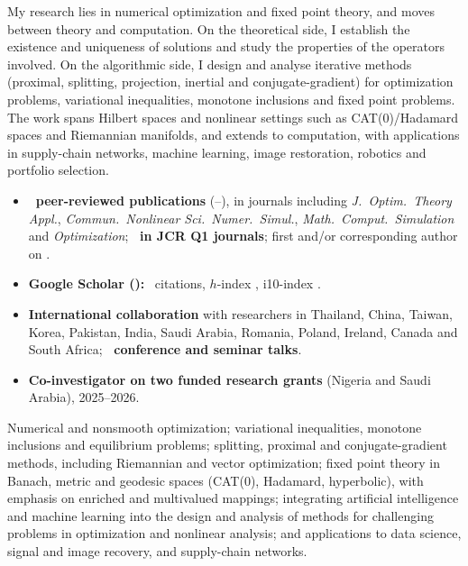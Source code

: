 \documentclass[11pt,a4paper]{article}
\newcommand{\cvsection}[1]{%
  \vspace{9pt}\pagebreak[2]%
  {\color{accent}\large\scshape #1}\par\nopagebreak
  \vspace{-3pt}{\color{accent}\rule{\linewidth}{0.8pt}}\par\nopagebreak
  \vspace{4pt}}
\begin{document}
\cvsection{Research Profile}
My research lies in numerical optimization and fixed point theory, and moves between theory and computation. On the theoretical side, I establish the existence and uniqueness of solutions and study the properties of the operators involved. On the algorithmic side, I design and analyse iterative methods (proximal, splitting, projection, inertial and conjugate-gradient) for optimization problems, variational inequalities, monotone inclusions and fixed point problems. The work spans Hilbert spaces and nonlinear settings such as CAT(0)/Hadamard spaces and Riemannian manifolds, and extends to computation, with applications in supply-chain networks, machine learning, image restoration, robotics and portfolio selection.
\vspace{5pt}
\begin{itemize}
  \item \textbf{\npubs\ peer-reviewed publications} (\firstyear--\lastyear), in journals including \emph{J.\ Optim.\ Theory Appl.},
        \emph{Commun.\ Nonlinear Sci.\ Numer.\ Simul.}, \emph{Math.\ Comput.\ Simulation} and \emph{Optimization};
        \textbf{\nqone\ in JCR Q1 journals}; first and/or corresponding author on \nlead.
  \item \textbf{Google Scholar (\scholardate):} \scholarcitations\ citations, $h$-index \scholarh, i10-index \scholarten.
  \item \textbf{International collaboration} with researchers in Thailand, China, Taiwan, Korea, Pakistan, India,
        Saudi Arabia, Romania, Poland, Ireland, Canada and South Africa; \textbf{\ntalks\ conference and seminar talks}.
  \item \textbf{Co-investigator on two funded research grants} (Nigeria and Saudi Arabia), 2025--2026.
\end{itemize}
\cvsection{Research Interests}
Numerical and nonsmooth optimization; variational inequalities, monotone inclusions and equilibrium problems; splitting, proximal and conjugate-gradient methods, including Riemannian and vector optimization; fixed point theory in Banach, metric and geodesic spaces (CAT(0), Hadamard, hyperbolic), with emphasis on enriched and multivalued mappings; integrating artificial intelligence and machine learning into the design and analysis of methods for challenging problems in optimization and nonlinear analysis; and applications to data science, signal and image recovery, and supply-chain networks.
\end{document}
